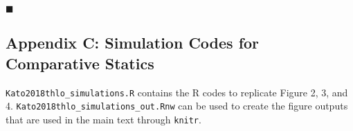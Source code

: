 \hfill $\blacksquare$  

\subsection{Appendix C: Simulation Codes for Comparative Statics}

\par \nolinkurl{Kato2018thlo_simulations.R} contains the R codes to replicate Figure 2, 3, and 4. \nolinkurl{Kato2018thlo_simulations_out.Rnw} can be used to create the figure outputs that are used in the main text through \nolinkurl{knitr}.


